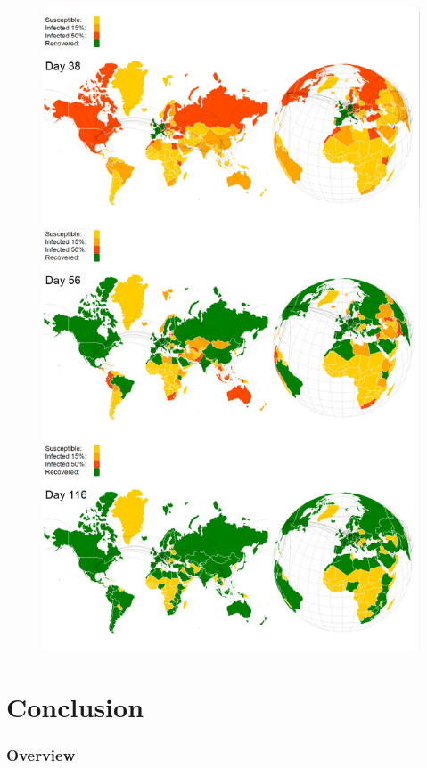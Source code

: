 \documentclass{beamer}
\begin{document}
\begin{frame}
\begin{figure}[H]
\includegraphics[scale=0.09]{img/tot_map2.jpg}

\end{figure}


\end{frame}
\section{Conclusion}
\begin{frame}
\frametitle{Overview} %
\tableofcontents[currentsection] %
\end{frame}
\end{document}
